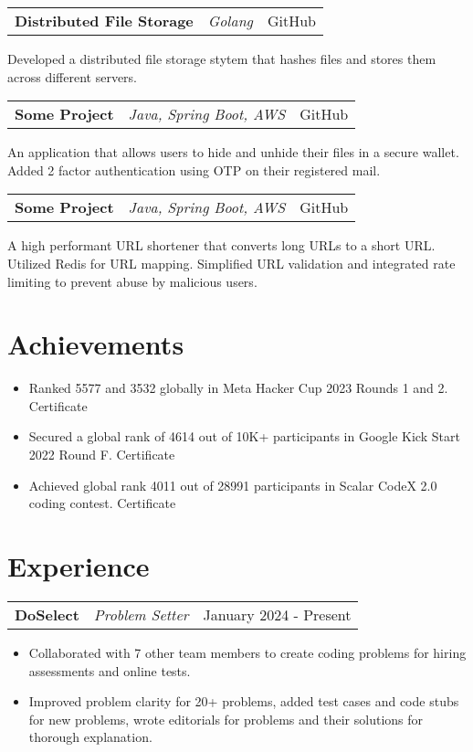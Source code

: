 \documentclass[a4paper,10pt]{article}
\makeatletter
\newenvironment{jobshort}[3]
    {
    \begin{tabularx}{\linewidth}{@{}l X r@{}}
    \textbf{#1} & \textit{#2} &  #3 \\[3pt]
    \end{tabularx}
    }
    {
    }
\newenvironment{joblong}[3]
    {
    \begin{tabularx}{\linewidth}{@{}l X r@{}}
    \textbf{#1} & \textit{#2} &  #3 \\[3pt]
    \end{tabularx}
    \begin{minipage}[t]{\linewidth}
    \begin{itemize}[nosep,after=\strut, leftmargin=1em, itemsep=2pt,label=--]
    }
    {
    \end{itemize}
    \end{minipage}    
    }
\makeatother
\begin{document}
\begin{jobshort}{Distributed File Storage}{Golang}{GitHub}
    Developed a distributed file storage stytem that hashes files and stores them across different servers.
\end{jobshort}

\begin{jobshort}{Some Project}{Java, Spring Boot, AWS}{GitHub}
    An application that allows users to hide and unhide their files in a secure wallet. Added 2 factor authentication using OTP
    on their registered mail.
\end{jobshort}

\begin{jobshort}{Some Project}{Java, Spring Boot, AWS}{GitHub}
    A high performant URL shortener that converts long URLs to a short URL. Utilized Redis for URL mapping. Simplified
    URL validation and integrated rate limiting to prevent abuse by malicious users.
\end{jobshort}
\vspace{-5pt}



\section{Achievements}
\vspace{-5pt}
\begin{itemize}[nosep,after=\strut, leftmargin=1em, itemsep=2pt,label=--]
    \item Ranked 5577 and 3532 globally in Meta Hacker Cup 2023 Rounds 1 and 2. Certificate
    \item Secured a global rank of 4614 out of 10K+ participants in Google Kick Start 2022 Round F. Certificate
    \item Achieved global rank 4011 out of 28991 participants in Scalar CodeX 2.0 coding contest. Certificate
\end{itemize}
\vspace{-5pt}

\section{Experience}
\vspace{-5pt}
\begin{joblong}{DoSelect}{Problem Setter}{January 2024 - Present}
    \item Collaborated with 7 other team members to create coding problems for hiring assessments and online tests.
    \item Improved problem clarity for 20+ problems, added test cases and code stubs for new problems, wrote editorials for
    problems and their solutions for thorough explanation.
\end{joblong}
\end{document}
